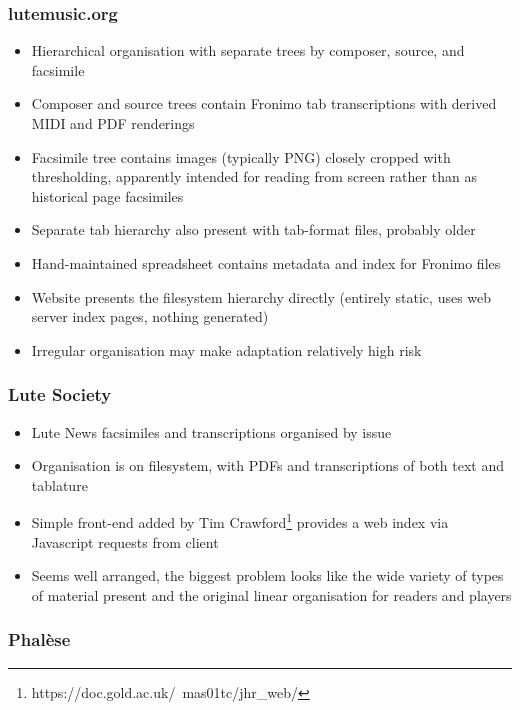 \documentclass[sigconf, nonacm=true]{acmart}
\begin{document}
\begin{sloppypar}
  \subsubsection{lutemusic.org}

  \begin{itemize}
  \item Hierarchical organisation with separate trees by composer,
    source, and facsimile
  \item Composer and source trees contain Fronimo tab transcriptions
    with derived MIDI and PDF renderings
  \item Facsimile tree contains images (typically PNG) closely cropped
    with thresholding, apparently intended for reading from screen
    rather than as historical page facsimiles
  \item Separate tab hierarchy also present with tab-format files,
    probably older
  \item Hand-maintained spreadsheet contains metadata and index for
    Fronimo files
  \item Website presents the filesystem hierarchy directly (entirely
    static, uses web server index pages, nothing generated)
  \item Irregular organisation may make adaptation relatively high
    risk
  \end{itemize}
    
  \subsubsection{Lute Society}

  \begin{itemize}
  \item Lute News facsimiles and transcriptions organised by issue
  \item Organisation is on filesystem, with PDFs and transcriptions of
    both text and tablature
  \item Simple front-end added by Tim
    Crawford\footnote{https://doc.gold.ac.uk/~mas01tc/jhr\_web/}
    provides a web index via Javascript requests from client
  \item Seems well arranged, the biggest problem looks like the wide
    variety of types of material present and the original linear
    organisation for readers and players
  \end{itemize}
  
  \subsubsection{Phal\`ese}


\end{sloppypar}
\end{document}
